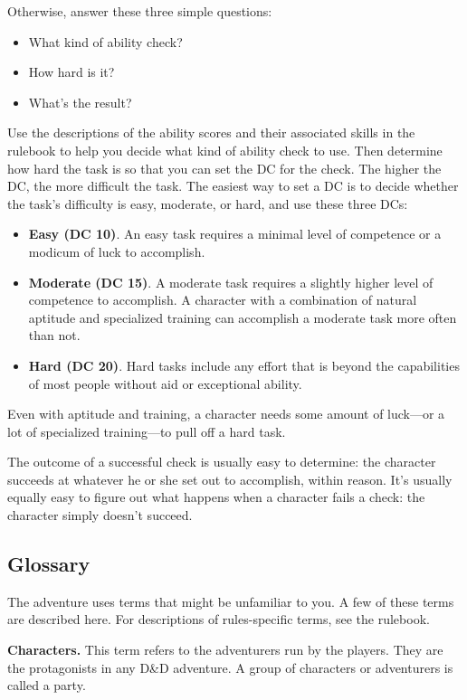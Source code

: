 \documentclass[10pt,a4paper,twoside,bg=print,twocolumn,openany,nodeprecatedcode]{dndbook}
\begin{document}
Otherwise, answer these three simple questions:


\begin{itemize}
\item What kind of ability check?
\item How hard is it?
\item What's the result?
\end{itemize}

Use the descriptions of the ability scores and their associated skills in the rulebook to help you decide what kind of ability check to use. Then determine how hard the task is so that you can set the DC for the check. The higher the DC, the more difficult the task. The easiest way to set a DC is to decide whether the task's difficulty is easy, moderate, or hard, and use these three DCs:


\begin{itemize}
\item \textbf{Easy (DC 10)}. An easy task requires a minimal level of competence or a modicum of luck to accomplish.
\item \textbf{Moderate (DC 15)}. A moderate task requires a slightly higher level of competence to accomplish. A character with a combination of natural aptitude and specialized training can accomplish a moderate task more often than not.
\item \textbf{Hard (DC 20)}. Hard tasks include any effort that is beyond the capabilities of most people without aid or exceptional ability.
\end{itemize}

Even with aptitude and training, a character needs some amount of luck—or a lot of specialized training—to pull off a hard task.

The outcome of a successful check is usually easy to determine: the character succeeds at whatever he or she set out to accomplish, within reason. It's usually equally easy to figure out what happens when a character fails a check: the character simply doesn't succeed.

\subsection{Glossary}
The adventure uses terms that might be unfamiliar to you. A few of these terms are described here. For descriptions of rules-specific terms, see the rulebook.

\textbf{Characters.} This term refers to the adventurers run by the players. They are the protagonists in any D\&D adventure. A group of characters or adventurers is called a party.
\end{document}
